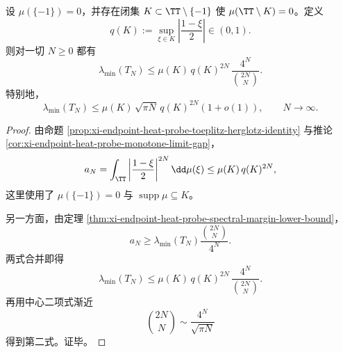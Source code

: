 \begin{theorem}\label{thm:conclusion-endpoint-gap-forces-exponential-collapse-of-toeplitz-minimum}
设 \(\mu(\{-1\})=0\)，并存在闭集 \(K\subset \TT\setminus\{-1\}\) 使 \(\mu(\TT\setminus K)=0\)。定义
\[
q(K):=\sup_{\xi\in K}\left|\frac{1-\xi}{2}\right|\in(0,1).
\]
则对一切 \(N\ge0\) 都有
\[
\lambda_{\min}(T_N)
\le
\mu(K)\,q(K)^{2N}\,\frac{4^N}{\binom{2N}{N}}.
\]
特别地，
\[
\lambda_{\min}(T_N)
\le
\mu(K)\,\sqrt{\pi N}\,q(K)^{2N}(1+o(1)),
\qquad N\to\infty.
\]
\end{theorem}
\begin{proof}
由命题 \ref{prop:xi-endpoint-heat-probe-toeplitz-herglotz-identity} 与推论 \ref{cor:xi-endpoint-heat-probe-monotone-limit-gap}，
\[
a_N
=
\int_{\TT}\left|\frac{1-\xi}{2}\right|^{2N}\dd\mu(\xi)
\le
\mu(K)\,q(K)^{2N},
\]
这里使用了 \(\mu(\{-1\})=0\) 与 \(\operatorname{supp}\mu\subseteq K\)。

另一方面，由定理 \ref{thm:xi-endpoint-heat-probe-spectral-margin-lower-bound}，
\[
a_N\ge \lambda_{\min}(T_N)\frac{\binom{2N}{N}}{4^N}.
\]
两式合并即得
\[
\lambda_{\min}(T_N)
\le
\mu(K)\,q(K)^{2N}\,\frac{4^N}{\binom{2N}{N}}.
\]
再用中心二项式渐近
\[
\binom{2N}{N}\sim \frac{4^N}{\sqrt{\pi N}}
\]
得到第二式。证毕。
\end{proof}

